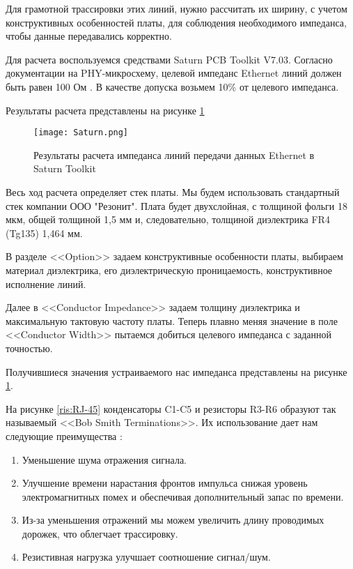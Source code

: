 Для грамотной трассировки этих линий, нужно рассчитать их ширину, с учетом конструктивных особенностей 
платы, для соблюдения необходимого импеданса, чтобы данные передавались корректно. 

Для расчета воспользуемся средствами Saturn PCB Toolkit V7.03. Согласно документации на PHY-микросхему,
целевой импеданс Ethernet линий должен быть равен 100 Ом \cite{DP83848:datasheet}. В качестве допуска 
возьмем 10\% от целевого импеданса. 

Результаты расчета представлены на рисунке \ref{ris:Saturn}

\begin{figure}[H]
\centering
\texttt{[image: Saturn.png]}
\caption{Результаты расчета импеданса линий передачи данных Ethernet в Saturn Toolkit}
\label{ris:Saturn}
\end{figure}

 Весь ход расчета определяет стек платы. Мы будем использовать стандартный стек компании ООО "Резонит". 
 Плата будет двухслойная, с толщиной фольги 18 мкм, общей толщиной 1,5 мм и, следовательно, толщиной 
 диэлектрика FR4 (Tg135) 1,464 мм. 

 В разделе <<Option>> задаем конструктивные особенности платы, выбираем материал диэлектрика, его 
 диэлектрическую проницаемость, конструктивное исполнение линий. 

 Далее в <<Conductor Impedance>> задаем толщину диэлектрика и максимальную тактовую частоту платы. Теперь 
 плавно меняя значение в поле <<Conductor Width>> пытаемся добиться целевого импеданса с заданной точностью. 

 Получившиеся значения устраиваемого нас импеданса представлены на рисунке \ref{ris:Saturn}. 
 
На рисунке \ref{ris:RJ-45} конденсаторы C1-C5 и резисторы R3-R6 образуют так называемый <<Bob Smith Terminations>>. 
Их использование дает нам следующие преимущества \cite{Bob Smith terminator}:

\begin{enumerate}
    \item Уменьшение шума отражения сигнала.
    \item Улучшение времени нарастания фронтов импульса снижая уровень электромагнитных помех 
    и обеспечивая дополнительный запас по времени.
    \item Из-за уменьшения отражений мы можем увеличить длину проводимых дорожек, что облегчает трассировку.
    \item Резистивная нагрузка улучшает соотношение сигнал/шум.
\end{enumerate}



